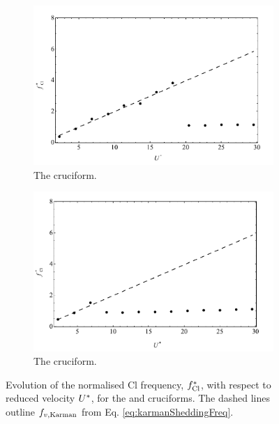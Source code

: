 \documentclass[oneside]{utmthesis}
\begin{document}
\begin{figure}
  \centering
  \begin{subfigure}[h]{1\textwidth}
    \includegraphics[width=\textwidth]{figs/clFreq2}
    \caption{The \angtw{} cruciform.}
    \label{fig:clFreq2}
  \end{subfigure}
  
  \begin{subfigure}[h]{1\textwidth}
    \includegraphics[width=\textwidth]{figs/clFreq1}
    \caption{The \angon{} cruciform.}
    \label{fig:clFreq1}
  \end{subfigure}

  \label{fig:clFreq21}
  \caption{Evolution of the normalised Cl frequency, $f_{\text{Cl}}^{*}$, with respect to reduced velocity $U^{*}$, for the \angtw{} and \angon{} cruciforms. The dashed lines outline $f_{v,\text{Karman}}$ from Eq. \ref{eq:karmanSheddingFreq}.}
\end{figure}
\end{document}
